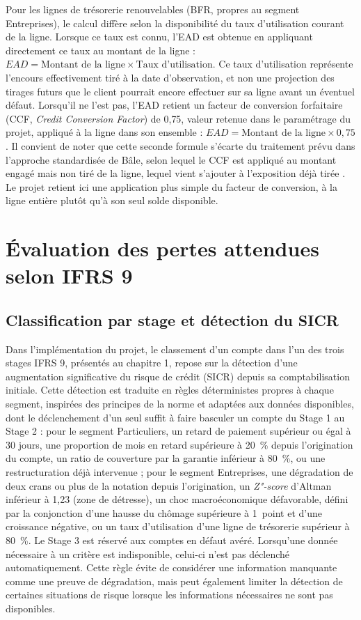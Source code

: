 Pour les lignes de trésorerie renouvelables (BFR, propres au segment Entreprises), le calcul diffère selon la disponibilité du taux d'utilisation courant de la ligne. Lorsque ce taux est connu, l'EAD est obtenue en appliquant directement ce taux au montant de la ligne : $EAD = \text{Montant de la ligne} \times \text{Taux d'utilisation}$. Ce taux d'utilisation représente l'encours effectivement tiré à la date d'observation, et non une projection des tirages futurs que le client pourrait encore effectuer sur sa ligne avant un éventuel défaut. Lorsqu'il ne l'est pas, l'EAD retient un facteur de conversion forfaitaire (CCF, \emph{Credit Conversion Factor}) de 0{,}75, valeur retenue dans le paramétrage du projet, appliqué à la ligne dans son ensemble : $EAD = \text{Montant de la ligne} \times 0{,}75$. Il convient de noter que cette seconde formule s'écarte du traitement prévu dans l'approche standardisée de Bâle, selon lequel le CCF est appliqué au montant engagé mais non tiré de la ligne, lequel vient s'ajouter à l'exposition déjà tirée \parencite{BCBS_CRE20}. Le projet retient ici une application plus simple du facteur de conversion, à la ligne entière plutôt qu'à son seul solde disponible.

\section{Évaluation des pertes attendues selon IFRS 9}

\subsection{Classification par stage et détection du SICR}

Dans l'implémentation du projet, le classement d'un compte dans l'un des trois stages IFRS 9, présentés au chapitre 1, repose sur la détection d'une augmentation significative du risque de crédit (SICR) depuis sa comptabilisation initiale. Cette détection est traduite en règles déterministes propres à chaque segment, inspirées des principes de la norme et adaptées aux données disponibles, dont le déclenchement d'un seul suffit à faire basculer un compte du Stage 1 au Stage 2 : pour le segment Particuliers, un retard de paiement supérieur ou égal à 30 jours, une proportion de mois en retard supérieure à 20~\% depuis l'origination du compte, un ratio de couverture par la garantie inférieur à 80~\%, ou une restructuration déjà intervenue ; pour le segment Entreprises, une dégradation de deux crans ou plus de la notation depuis l'origination, un \emph{Z"-score} d'Altman inférieur à 1,23 (zone de détresse), un choc macroéconomique défavorable, défini par la conjonction d'une hausse du chômage supérieure à 1~point et d'une croissance négative, ou un taux d'utilisation d'une ligne de trésorerie supérieur à 80~\%. Le Stage 3 est réservé aux comptes en défaut avéré. Lorsqu'une donnée nécessaire à un critère est indisponible, celui-ci n'est pas déclenché automatiquement. Cette règle évite de considérer une information manquante comme une preuve de dégradation, mais peut également limiter la détection de certaines situations de risque lorsque les informations nécessaires ne sont pas disponibles.

